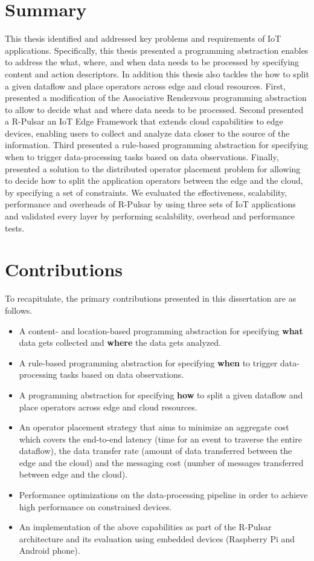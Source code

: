 \section{Summary}
This thesis identified and addressed key problems and requirements of IoT applications. Specifically, this thesis presented a programming abstraction enables to address the what, where, and when data needs to be processed by specifying content and action descriptors. In addition this thesis also tackles the how to split a given dataflow and place operators across edge and cloud resources. First, presented a modification of the Associative Rendezvous programming abstraction to allow to decide what and where data needs to be processed. Second presented a R-Pulsar an IoT Edge Framework that extends cloud capabilities to edge devices, enabling users to collect and analyze data closer to the source of the information. Third presented a rule-based programming abstraction for specifying when to trigger data-processing tasks based on data observations. Finally, presented a solution to the distributed operator placement problem for allowing to decide how to split the application operators between the edge and the cloud, by specifying a set of constraints. We evaluated the effectiveness, scalability, performance and overheads of R-Pulsar by using three sets of IoT applications and validated every layer by performing scalability, overhead and performance tests.

\section{Contributions}
To recapitulate, the primary contributions presented in this dissertation are as follows.
\begin{itemize}
  \item A content- and location-based programming abstraction for specifying \textbf{what} data gets collected and \textbf{where} the data gets analyzed.
  \item A rule-based programming abstraction for specifying \textbf{when} to trigger data-processing tasks based on data observations.
  \item A programming abstraction for specifying \textbf{how} to split a given dataflow and place operators across edge and cloud resources.
  \item An operator placement strategy that aims to minimize an aggregate cost which covers the end-to-end latency (time for an event to traverse the entire dataflow), the data transfer rate (amount of data transferred between the edge and the cloud) and the messaging cost (number of messages transferred between edge and the cloud).
  \item Performance optimizations on the data-processing pipeline in order to achieve high performance on constrained devices.
  \item An implementation of the above capabilities as part of the R-Pulsar architecture and its evaluation using embedded devices (Raspberry Pi and Android phone).
\end{itemize}

